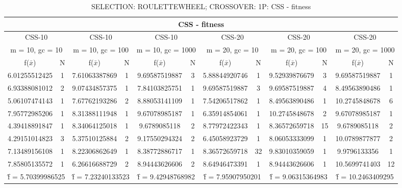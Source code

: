 \begin{table}[H]
	\centering
	\caption{SELECTION: ROULETTEWHEEL; CROSSOVER: 1P: CSS - fitness}
	\begin{adjustbox}{width=1\textwidth}
		\begin{tabular}{ |c|c||c|c||c|c||c|c||c|c||c|c| }
			\hline
			\multicolumn{12}{|c|}{CSS - fitness} \\
			\hline
			\multicolumn{2}{|c||}{CSS-10} & \multicolumn{2}{c||}{CSS-10} & \multicolumn{2}{c||}{CSS-10} & \multicolumn{2}{c||}{CSS-20} & \multicolumn{2}{c||}{CSS-20} & \multicolumn{2}{c|}{CSS-20}\\
			\hline
			\multicolumn{2}{|c||}{m = 10, gc = 10} & \multicolumn{2}{c||}{m = 10, gc = 100} & \multicolumn{2}{c||}{m = 10, gc = 1000} & \multicolumn{2}{c||}{m = 20, gc = 10} & \multicolumn{2}{c||}{m = 20, gc = 100} & \multicolumn{2}{c|}{m = 20, gc = 1000}\\
			\hline
			f($\bar{x}$) & N & f($\bar{x}$) & N & f($\bar{x}$) & N & f($\bar{x}$) & N & f($\bar{x}$) & N & f($\bar{x}$) & N\\
			\hline
			\hline
			6.01255512425 & 1 & 7.61063387869 & 1 & 9.69587519887 & 3 & 5.88844920746 & 1 & 9.52939876679 & 3 & 9.69587519887 & 1\\
			6.93388081012 & 2 & 9.07434857375 & 1 & 7.84103825751 & 1 & 9.69587519887 & 3 & 9.69587519887 & 4 & 8.49563890486 & 1\\
			5.06107474143 & 1 & 7.67762193286 & 2 & 8.88053141109 & 1 & 7.54206517862 & 1 & 8.49563890486 & 1 & 10.2745848678 & 6\\
			7.95772985206 & 1 & 8.31388111948 & 1 & 9.67078985187 & 1 & 6.35914854061 & 1 & 10.2745848678 & 2 & 9.67078985187 & 1\\
			4.39418891847 & 1 & 8.34064125018 & 1 & 9.6789085118 & 2 & 8.77972422343 & 1 & 8.36572659718 & 15 & 9.6789085118 & 2\\
			4.29151014823 & 3 & 5.37510125884 & 2 & 9.17550294324 & 2 & 6.45058923729 & 1 & 8.06053333099 & 1 & 10.0789877877 & 2\\
			7.13489156108 & 1 & 8.22306862649 & 1 & 8.38772886717 & 1 & 8.36572659718 & 32 & 9.83010359059 & 1 & 9.9796133356 & 1\\
			7.85805135572 & 1 & 6.26616688729 & 2 & 8.94443626606 & 2 & 8.64946473391 & 1 & 8.94443626606 & 1 & 10.5699741403 & 12\\
			\hline
			\multicolumn{2}{|c||}{\^{f} = 5.70399986525} & \multicolumn{2}{c||}{\^{f} = 7.23240133523} & \multicolumn{2}{c||}{\^{f} = 9.42948768982} & \multicolumn{2}{c||}{\^{f} = 7.95907950201} & \multicolumn{2}{c||}{\^{f} = 9.06315364983} & \multicolumn{2}{c|}{\^{f} = 10.2463409295}\\
			\hline
		\end{tabular}
	\end{adjustbox}
\end{table}
